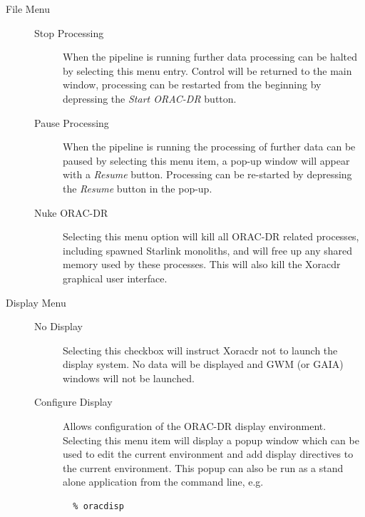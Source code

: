 \documentclass[twoside,11pt]{article}
\renewcommand{\_}{\texttt{\symbol{95}}}
\begin{document}
\begin{description}

\item[{File Menu}] \mbox{}\begin{description}

\item[{Stop Processing}] \mbox{}

When the pipeline is running further data processing can be halted by
selecting this menu entry. Control will be returned to the main
window, processing can be restarted from the beginning by depressing
the \textit{Start ORAC-DR} button.


\item[{Pause Processing}] \mbox{}

When the pipeline is running the processing of further data can be
paused by selecting this menu item, a pop-up window will appear with a
\textit{Resume} button. Processing can be re-started by depressing the
\textit{Resume} button in the pop-up.


\item[{Nuke ORAC-DR}] \mbox{}

Selecting this menu option will kill all ORAC-DR related processes,
including spawned Starlink monoliths, and will free up any shared
memory used by these processes. This will also kill the Xoracdr
graphical user interface.

\end{description}

\item[{Display Menu}] \mbox{}\begin{description}

\item[{No Display}] \mbox{}

Selecting this checkbox will instruct Xoracdr not to launch the
display system. No data will be displayed and GWM (or GAIA) windows
will not be launched.


\item[{Configure Display}] \mbox{}

Allows configuration of the ORAC-DR display environment. Selecting
this menu item will display a popup window which can be used to edit
the current environment and add display directives to the current
environment. This popup can also be run as a stand alone application
from the command line, e.g.

\begin{verbatim}
  % oracdisp
\end{verbatim}



\end{description}
\end{description}
\end{document}
